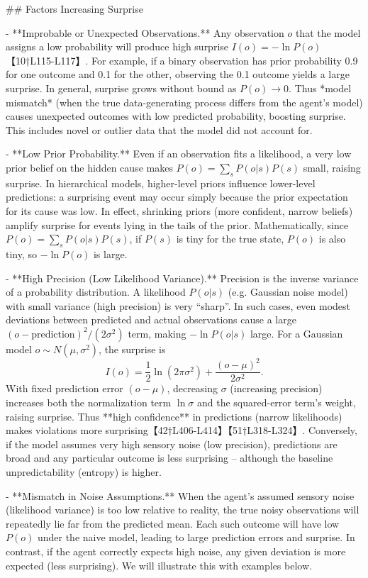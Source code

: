 \documentclass[a4paper]{article}
\begin{document}
    ## Factors Increasing Surprise
    
    - **Improbable or Unexpected Observations.**  Any observation \(o\) that the model assigns a low probability will produce high surprise \(I(o) = -\ln P(o)\)【10†L115-L117】.  For example, if a binary observation has prior probability 0.9 for one outcome and 0.1 for the other, observing the 0.1 outcome yields a large surprise.  In general, surprise grows without bound as \(P(o)\to 0\).  Thus *model mismatch* (when the true data-generating process differs from the agent’s model) causes unexpected outcomes with low predicted probability, boosting surprise.  This includes novel or outlier data that the model did not account for.
    
    - **Low Prior Probability.**  Even if an observation fits a likelihood, a very low prior belief on the hidden cause makes \(P(o)=\sum_s P(o|s)P(s)\) small, raising surprise.  In hierarchical models, higher-level priors influence lower-level predictions: a surprising event may occur simply because the prior expectation for its cause was low.  In effect, shrinking priors (more confident, narrow beliefs) amplify surprise for events lying in the tails of the prior.  Mathematically, since \(P(o)=\sum_s P(o|s)P(s)\), if \(P(s)\) is tiny for the true state, \(P(o)\) is also tiny, so \(-\ln P(o)\) is large.
    
    - **High Precision (Low Likelihood Variance).**  Precision is the inverse variance of a probability distribution.  A likelihood \(P(o|s)\) (e.g. Gaussian noise model) with small variance (high precision) is very “sharp”.  In such cases, even modest deviations between predicted and actual observations cause a large \((o-\text{prediction})^2/(2\sigma^2)\) term, making \(-\ln P(o|s)\) large.  For a Gaussian model \(o\sim N(\mu,\sigma^2)\), the surprise is
      \[
      I(o) = \frac{1}{2}\ln(2\pi\sigma^2) + \frac{(o-\mu)^2}{2\sigma^2}.
      \]
      With fixed prediction error \((o-\mu)\), decreasing \(\sigma\) (increasing precision) increases both the normalization term \(\ln\sigma\) and the squared-error term’s weight, raising surprise.  Thus **high confidence** in predictions (narrow likelihoods) makes violations more surprising【42†L406-L414】【51†L318-L324】.  Conversely, if the model assumes very high sensory noise (low precision), predictions are broad and any particular outcome is less surprising – although the baseline unpredictability (entropy) is higher.
    
    - **Mismatch in Noise Assumptions.**  When the agent’s assumed sensory noise (likelihood variance) is too low relative to reality, the true noisy observations will repeatedly lie far from the predicted mean. Each such outcome will have low \(P(o)\) under the naive model, leading to large prediction errors and surprise.  In contrast, if the agent correctly expects high noise, any given deviation is more expected (less surprising).  We will illustrate this with examples below.
    
\end{document}
